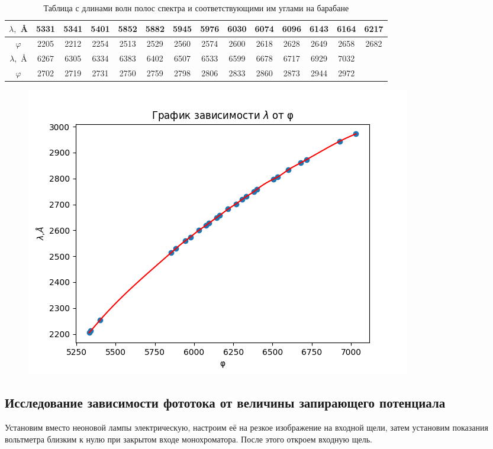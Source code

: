 \documentclass[a4paper,12pt]{article}
\begin{document}
\begin{table}[H]
    \centering
    \begin{tabular}{|c|c|c|c|c|c|c|c|c|c|c|c|c|c|}
    \hline
      $\lambda,$ \AA   & 5331 & 5341 & 5401 & 5852 & 5882 & 5945 & 5976 & 6030 & 6074 & 6096 & 6143 & 6164 & 6217\\
      \hline
      $\varphi$   & 2205 & 2212 & 2254 & 2513 & 2529 & 2560 & 2574 & 2600 & 2618 & 2628 & 2649 & 2658 & 2682\\
    \hline      
    $\lambda,$ \AA   & 6267 & 6305 & 6334 & 6383 & 6402 & 6507 & 6533 & 6599 & 6678 & 6717 & 6929 & 7032 &\\
      \hline
      $\varphi$ & 2702 & 2719 & 2731 & 2750 & 2759 & 2798 & 2806 & 2833 & 2860 & 2873 & 2944 & 2972 & \\
    \hline
    		
    \end{tabular}
    \caption{Таблица с длинами волн полос спектра и соответствующими им углами на барабане}
    \label{Таблица с длинами волн полос спектра и соответствующими им углами на барабане}
\end{table}
\begin{figure}[H]
\centering
\includegraphics[scale=1]{graph1.png}
\end{figure}

\subsection*{Исследование зависимости фототока от величины запирающего потенциала}

Установим вместо неоновой лампы электрическую, настроим её на резкое изображение на входной щели, затем установим показания вольтметра близким к нулю при закрытом входе монохроматора. После этого откроем входную щель.
\end{document}
